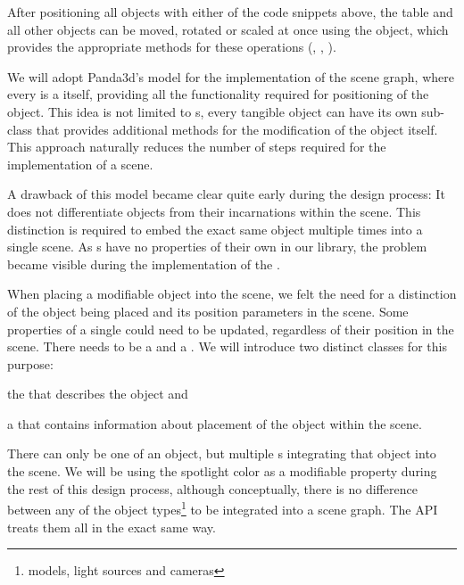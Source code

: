 	After positioning all objects with either of the code snippets above, the table and all other objects can be moved, rotated or scaled at once using the  object, which provides the appropriate methods for these operations (, , ).

	We will adopt Panda3d's model for the implementation of the scene graph, where every  is a  itself, providing all the functionality required for positioning of the object. This idea is not limited to s, every tangible object can have its own  sub-class that provides additional methods for the modification of the object itself. This approach naturally reduces the number of steps required for the implementation of a scene.

	A drawback of this model became clear quite early during the design process: It does not differentiate objects from their incarnations within the scene. This distinction is required to embed the exact same object multiple times into a single scene. As s have no properties of their own in our library, the problem became visible during the implementation of the .

	When placing a modifiable object into the scene, we felt the need for a distinction of the object being placed and its position parameters in the scene. Some properties of a single  could need to be updated, regardless of their position in the scene. There needs to be a  and a . We will introduce two distinct classes for this purpose:

	\begin{smalllist}
		\item the  that describes the object and
		\item a  that contains information about placement of the object within the scene.
	\end{smalllist}

	There can only be one  of an object, but multiple s integrating that object into the scene. We will be using the spotlight color as a modifiable property during the rest of this design process, although conceptually, there is no difference between any of the object types\footnote{models, light sources and cameras} to be integrated into a scene graph. The API treats them all in the exact same way.

